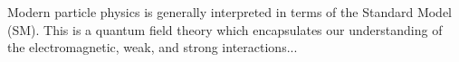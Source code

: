﻿Modern particle physics is generally interpreted in terms of the Standard Model (SM).
This is a quantum field theory which encapsulates our understanding of the electromagnetic, weak, and strong interactions...
